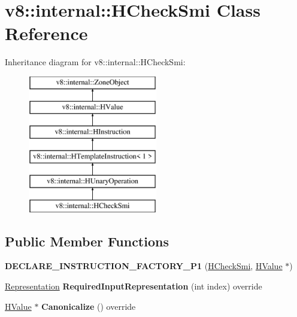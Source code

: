 \hypertarget{classv8_1_1internal_1_1_h_check_smi}{}\section{v8\+:\+:internal\+:\+:H\+Check\+Smi Class Reference}
\label{classv8_1_1internal_1_1_h_check_smi}
Inheritance diagram for v8\+:\+:internal\+:\+:H\+Check\+Smi\+:\begin{figure}[H]
\begin{center}
\leavevmode
\includegraphics[height=6.000000cm]{classv8_1_1internal_1_1_h_check_smi}
\end{center}
\end{figure}
\subsection*{Public Member Functions}
\begin{DoxyCompactItemize}
\item 
{\bfseries D\+E\+C\+L\+A\+R\+E\+\_\+\+I\+N\+S\+T\+R\+U\+C\+T\+I\+O\+N\+\_\+\+F\+A\+C\+T\+O\+R\+Y\+\_\+\+P1} (\hyperlink{classv8_1_1internal_1_1_h_check_smi}{H\+Check\+Smi}, \hyperlink{classv8_1_1internal_1_1_h_value}{H\+Value} $\ast$)\hypertarget{classv8_1_1internal_1_1_h_check_smi_a7c45b1cff20853da21fd8d11892a76ec}{}\label{classv8_1_1internal_1_1_h_check_smi_a7c45b1cff20853da21fd8d11892a76ec}

\item 
\hyperlink{classv8_1_1internal_1_1_representation}{Representation} {\bfseries Required\+Input\+Representation} (int index) override\hypertarget{classv8_1_1internal_1_1_h_check_smi_a8eaddbe5b555b9e92e2329293434c18a}{}\label{classv8_1_1internal_1_1_h_check_smi_a8eaddbe5b555b9e92e2329293434c18a}

\item 
\hyperlink{classv8_1_1internal_1_1_h_value}{H\+Value} $\ast$ {\bfseries Canonicalize} () override\hypertarget{classv8_1_1internal_1_1_h_check_smi_ab484baf83eed74496bf057d0bf7d52a6}{}\label{classv8_1_1internal_1_1_h_check_smi_ab484baf83eed74496bf057d0bf7d52a6}

\end{DoxyCompactItemize}
